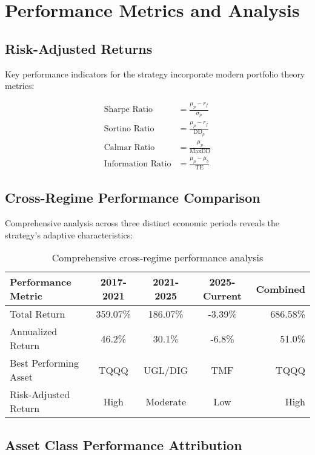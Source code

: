 \documentclass[onecolumn,ieee]{arithmaxresearch}
\begin{document}
\section{Performance Metrics and Analysis}

\subsection{Risk-Adjusted Returns}

Key performance indicators for the strategy incorporate modern portfolio theory metrics:

\begin{align}
\text{Sharpe Ratio} &= \frac{\mu_p - r_f}{\sigma_p} \\
\text{Sortino Ratio} &= \frac{\mu_p - r_f}{\text{DD}_p} \\
\text{Calmar Ratio} &= \frac{\mu_p}{\text{MaxDD}} \\
\text{Information Ratio} &= \frac{\mu_p - \mu_b}{\text{TE}}
\end{align}

\subsection{Cross-Regime Performance Comparison}

Comprehensive analysis across three distinct economic periods reveals the strategy's adaptive characteristics:

\begin{table}[h]
\centering
\begin{tabular}{lcccr}
\toprule
\textbf{Performance Metric} & \textbf{2017-2021} & \textbf{2021-2025} & \textbf{2025-Current} & \textbf{Combined} \\
\midrule
Total Return & 359.07\% & 186.07\% & -3.39\% & 686.58\% \\
Annualized Return & 46.2\% & 30.1\% & -6.8\% & 51.0\% \\
Best Performing Asset & TQQQ & UGL/DIG & TMF & TQQQ \\
Risk-Adjusted Return & High & Moderate & Low & High \\
\bottomrule
\end{tabular}
\caption{Comprehensive cross-regime performance analysis}
\end{table}

\subsection{Asset Class Performance Attribution}
\end{document}
